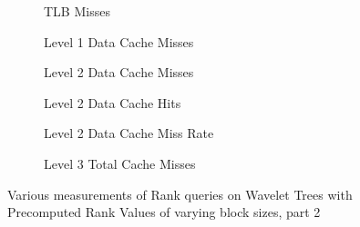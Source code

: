 \begin{figure}\tiny
\begin{subfigure}{0.48\textwidth}
	
	\caption{TLB Misses}
	\label{fig:PrecomputedRankBlockSize_Rank_TLB}
\end{subfigure}
\hfill
\begin{subfigure}{0.48\textwidth}
	
	\caption{Level 1 Data Cache Misses}
	\label{fig:PrecomputedRankBlockSize_Rank_L1CacheMiss}
\end{subfigure}
\begin{subfigure}{0.48\textwidth}
	
	\caption{Level 2 Data Cache Misses}
	\label{fig:PrecomputedRankBlockSize_Rank_L2CacheMiss}
\end{subfigure}
\hfill
\begin{subfigure}{0.48\textwidth}
	
	\caption{Level 2 Data Cache Hits}
	\label{fig:PrecomputedRankBlockSize_Rank_L2CacheHits}
\end{subfigure}
\begin{subfigure}{0.48\textwidth}
	
	\caption{Level 2 Data Cache Miss Rate}
	\label{fig:PrecomputedRankBlockSize_Rank_L2CacheMissRate}
\end{subfigure}
\hfill
\begin{subfigure}{0.48\textwidth}
	
	\caption{Level 3 Total Cache Misses}
	\label{fig:PrecomputedRankBlockSize_Rank_L3CacheMiss}
\end{subfigure}

\caption{Various measurements of Rank queries on Wavelet Trees with Precomputed Rank Values of varying block sizes, part 2}
\label{fig:PrecomputedRankBlockSize_Rank2}
\end{figure}






